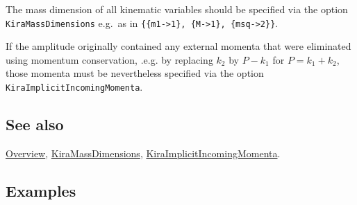 \documentclass[../FeynHelpersManual.tex]{subfiles}
\begin{document}
The mass dimension of all kinematic variables should be specified via
the option \texttt{KiraMassDimensions} e.g.~as in
\texttt{\{\allowbreak{}\{\allowbreak{}m1->1\},\ \allowbreak{}\{\allowbreak{}M->1\},\ \allowbreak{}\{\allowbreak{}msq->2\}\}}.

If the amplitude originally contained any external momenta that were
eliminated using momentum conservation, .e.g. by replacing \(k_2\) by
\(P-k_1\) for \(P=k_1+k_2\), those momenta must be nevertheless
specified via the option \texttt{KiraImplicitIncomingMomenta}.

\subsection{See also}

\hyperlink{toc}{Overview},
\hyperlink{kiramassdimensions}{KiraMassDimensions},
\hyperlink{kiraimplicitincomingmomenta}{KiraImplicitIncomingMomenta}.

\subsection{Examples}

\begin{Shaded}
\begin{Highlighting}[]
\ExtensionTok{=}\OperatorTok{[}\OperatorTok{,} \OperatorTok{\{}\OperatorTok{[\{}\OperatorTok{,} \OperatorTok{\}],} 
\OperatorTok{[\{}\OperatorTok{,}\SpecialCharTok{\^{}}\OperatorTok{\}],}\OperatorTok{[\{\{}\OperatorTok{,} \SpecialCharTok{*}\OperatorTok{\}\}],} 
\OperatorTok{[\{}\SpecialCharTok{+} \NormalTok{)}\OperatorTok{,}\SpecialCharTok{\^{}}\OperatorTok{\}],}\OperatorTok{[\{\{}\OperatorTok{,}\OperatorTok{\}\}]\},} 
   \OperatorTok{\{}\OperatorTok{,}\OperatorTok{\},} \OperatorTok{\{}\OperatorTok{\},} \OperatorTok{\{}\OperatorTok{[}\OperatorTok{][}\OperatorTok{,} \OperatorTok{]} \OtherTok{{-}\textgreater{}}\SpecialCharTok{\^{}}\OperatorTok{\},} \OperatorTok{\{\}]}
\end{Highlighting}
\end{Shaded}
\end{document}
